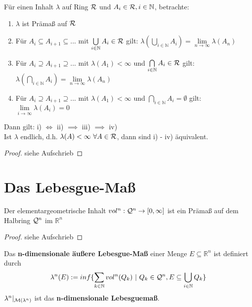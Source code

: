 \documentclass[11pt,a4paper,fleqn,openany]{report}
\begin{document}
    \begin{theorem}[(i.A. II.31)]
      Für einen Inhalt $\lambda$ auf Ring $\mathcal{R}$ und $A_i \in \mathcal{R}, i \in \mathbb{N}$, betrachte:
      \begin{enumerate}[label=\roman*)]
        \item $\lambda$ ist Prämaß auf $\mathcal{R}$
        \item Für $A_i \subseteq A_{i+1} \subseteq ...$ mit $\bigcup\limits_{i \in \mathbb{N}} A_i \in \mathcal{R}$ gilt: $\lambda(\bigcup\limits_{i \in \mathbb{N}} A_i) = \lim\limits_{n \to \infty} \lambda(A_n)$
        \item Für $A_i \supseteq A_{i+1} \supseteq ...$ mit $\lambda(A_1) < \infty$ und $\bigcap\limits_{i \in \mathbb{N}} A_i \in \mathcal{R}$ gilt:\\
        $\lambda(\bigcap\limits_{i \in \mathbb{N}} A_i) = \lim\limits_{n \to \infty} \lambda(A_n)$
        \item Für $A_i \supseteq A_{i+1} \supseteq ...$ mit $\lambda(A_1) < \infty$ und $\bigcap\limits_{i \in \mathbb{N}} A_i = \emptyset$ gilt: $\lim\limits_{i \to \infty} \lambda(A_i) = 0$
      \end{enumerate} 
      Dann gilt: i) $\Leftrightarrow$ ii) $\implies$ iii) $\implies$ iv)\\
      Ist $\lambda$ endlich, d.h. $\lambda(A) < \infty \ \forall A \in \script{R}$, dann sind i) - iv) äquivalent.
    \end{theorem}

    \begin{proof}
      siehe Aufschrieb
    \end{proof}

  \chapter{Das Lebesgue-Maß}
    \begin{lemma}
      Der elementargeometrische Inhalt $vol^n: \mathcal{Q}^n \to [0, \infty]$ ist ein Prämaß auf dem Halbring $\mathcal{Q}^n$ im $\mathbb{R}^n$
    \end{lemma}

    \begin{proof}
      siehe Aufschrieb
    \end{proof}

    \begin{definition}
      Das \textbf{n-dimensionale äußere Lebesgue-Maß} einer Menge $E \subseteq \mathbb{R}^n$ ist definiert durch
      \begin{align*}
        \lambda^n(E) := inf\{\sum\limits_{k \in \mathbb{N}} vol^n(Q_k) \ | \ Q_k \in \script{Q}^n, E \subseteq \bigcup\limits_{i \in \mathbb{N}} Q_k\}
      \end{align*}
      $\lambda^n|_{\mathcal{M}(\lambda^n)}$ ist das \textbf{n-dimensionale Lebesguemaß}.
    \end{definition}
\end{document}
